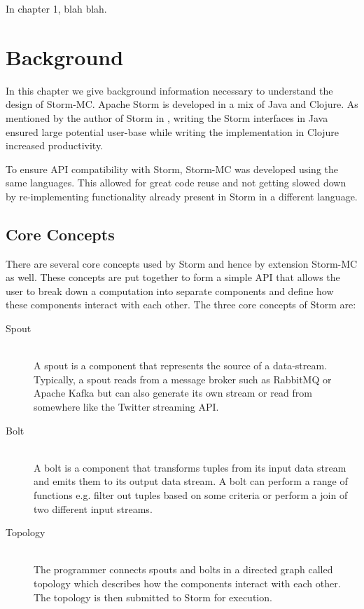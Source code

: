 \documentclass[bsc,logo,frontabs,twoside,singlespacing,normalheadings,parskip]{infthesis}     %
\begin{document}
In chapter 1, blah blah.




\chapter{Background}

In this chapter we give background information necessary to understand the design of Storm-MC. Apache Storm is developed in a mix of Java and Clojure. As mentioned by the author of Storm in \cite{Marz_2014}, writing the Storm interfaces in Java ensured large potential user-base while writing the implementation in Clojure increased productivity.

To ensure API compatibility with Storm, Storm-MC was developed using the same languages. This allowed for great code reuse and not getting slowed down by re-implementing functionality already present in Storm in a different language.

\section{Core Concepts}

There are several core concepts used by Storm and hence by extension Storm-MC as well. These concepts are put together to form a simple API that allows the user to break down a computation into separate components and define how these components interact with each other. The three core concepts of Storm are:

\begin{description}
  \item[Spout] \hfill \\
  A spout is a component that represents the source of a data-stream. Typically, a spout reads from a message broker such as RabbitMQ \cite{RabbitMQ} or Apache Kafka \cite{ApacheKafka} but can also generate its own stream or read from somewhere like the Twitter streaming API.
  \item[Bolt] \hfill \\
  A bolt is a component that transforms tuples from its input data stream and emits them to its output data stream. A bolt can perform a range of functions e.g. filter out tuples based on some criteria or perform a join of two different input streams.
  \item[Topology] \hfill \\
  The programmer connects spouts and bolts in a directed graph called topology which describes how the components interact with each other. The topology is then submitted to Storm for execution.
\end{description}
\end{document}
